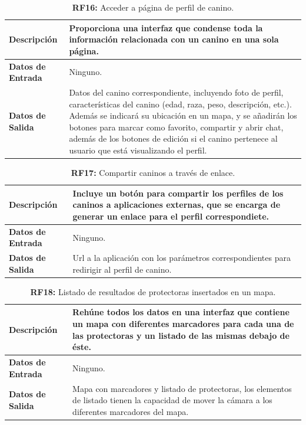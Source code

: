 \documentclass[a4paper, 12pt]{article}
\begin{document}
\begin{table}[H]
\captionsetup{list=no}%
\captionsetup{justification=raggedright,singlelinecheck=false}
\captionsetup{labelformat=empty}
\caption{\textbf{RF16:} Acceder a página de perfil de canino.}
\label{tab:RF16}
	\begin{tabular}{|m{5cm}|m{10cm}|}
	\hline
	\textbf{Descripción} & Proporciona una interfaz que condense toda la información relacionada con un canino en una sola página. \\ 
	\hline
	\textbf{Datos de Entrada} & Ninguno. \\ 
	\hline
	\textbf{Datos de Salida} & Datos del canino correspondiente, incluyendo foto de perfil, características del canino (edad, raza, peso, descripción, etc.). Además se indicará su ubicación en un mapa, y se añadirán los botones para marcar como favorito, compartir y abrir chat, además de los botones de edición si el canino pertenece al usuario que está visualizando el perfil. \\ 
	\hline
\end{tabular}
\end{table}

\begin{table}[H]
\captionsetup{list=no}%
\captionsetup{justification=raggedright,singlelinecheck=false}
\captionsetup{labelformat=empty}
\caption{\textbf{RF17:} Compartir caninos a través de enlace.}
\label{tab:RF17}
	\begin{tabular}{|m{5cm}|m{10cm}|}
	\hline
	\textbf{Descripción} & Incluye un botón para compartir los perfiles de los caninos a aplicaciones externas, que se encarga de generar un enlace para el perfil correspondiete.  \\ 
	\hline
	\textbf{Datos de Entrada} & Ninguno. \\ 
	\hline
	\textbf{Datos de Salida} & Url a la aplicación con los parámetros correspondientes para redirigir al perfil de canino. \\ 
	\hline
\end{tabular}
\end{table}

\begin{table}[H]
\captionsetup{list=no}%
\captionsetup{justification=raggedright,singlelinecheck=false}
\captionsetup{labelformat=empty}
\caption{\textbf{RF18:} Listado de resultados de protectoras insertados en un mapa.}
\label{tab:RF18}
	\begin{tabular}{|m{5cm}|m{10cm}|}
	\hline
	\textbf{Descripción} & Rehúne todos los datos en una interfaz que contiene un mapa con diferentes marcadores para cada una de las protectoras y un listado de las mismas debajo de éste. \\ 
	\hline
	\textbf{Datos de Entrada} & Ninguno. \\ 
	\hline
	\textbf{Datos de Salida} & Mapa con marcadores y listado de protectoras, los elementos  de listado tienen la capacidad de mover la cámara a los diferentes marcadores del mapa. \\ 
	\hline
\end{tabular}
\end{table}
\end{document}
